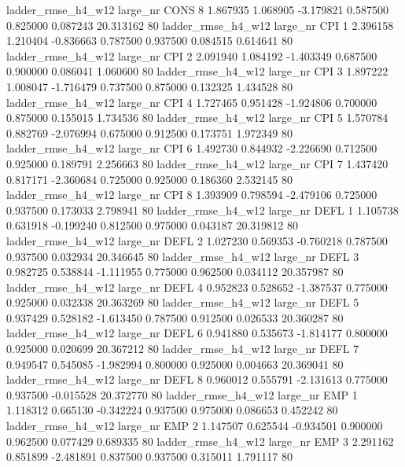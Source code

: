  ladder_rmse_h4_w12   large_nr     CONS                 8  1.867935  1.068905  -3.179821 0.587500 0.825000  0.087243   20.313162 80
 ladder_rmse_h4_w12   large_nr      CPI                 1  2.396158  1.210404  -0.836663 0.787500 0.937500  0.084515    0.614641 80
 ladder_rmse_h4_w12   large_nr      CPI                 2  2.091940  1.084192  -1.403349 0.687500 0.900000  0.086041    1.060600 80
 ladder_rmse_h4_w12   large_nr      CPI                 3  1.897222  1.008047  -1.716479 0.737500 0.875000  0.132325    1.434528 80
 ladder_rmse_h4_w12   large_nr      CPI                 4  1.727465  0.951428  -1.924806 0.700000 0.875000  0.155015    1.734536 80
 ladder_rmse_h4_w12   large_nr      CPI                 5  1.570784  0.882769  -2.076994 0.675000 0.912500  0.173751    1.972349 80
 ladder_rmse_h4_w12   large_nr      CPI                 6  1.492730  0.844932  -2.226690 0.712500 0.925000  0.189791    2.256663 80
 ladder_rmse_h4_w12   large_nr      CPI                 7  1.437420  0.817171  -2.360684 0.725000 0.925000  0.186360    2.532145 80
 ladder_rmse_h4_w12   large_nr      CPI                 8  1.393909  0.798594  -2.479106 0.725000 0.937500  0.173033    2.798941 80
 ladder_rmse_h4_w12   large_nr     DEFL                 1  1.105738  0.631918  -0.199240 0.812500 0.975000  0.043187   20.319812 80
 ladder_rmse_h4_w12   large_nr     DEFL                 2  1.027230  0.569353  -0.760218 0.787500 0.937500  0.032934   20.346645 80
 ladder_rmse_h4_w12   large_nr     DEFL                 3  0.982725  0.538844  -1.111955 0.775000 0.962500  0.034112   20.357987 80
 ladder_rmse_h4_w12   large_nr     DEFL                 4  0.952823  0.528652  -1.387537 0.775000 0.925000  0.032338   20.363269 80
 ladder_rmse_h4_w12   large_nr     DEFL                 5  0.937429  0.528182  -1.613450 0.787500 0.912500  0.026533   20.360287 80
 ladder_rmse_h4_w12   large_nr     DEFL                 6  0.941880  0.535673  -1.814177 0.800000 0.925000  0.020699   20.367212 80
 ladder_rmse_h4_w12   large_nr     DEFL                 7  0.949547  0.545085  -1.982994 0.800000 0.925000  0.004663   20.369041 80
 ladder_rmse_h4_w12   large_nr     DEFL                 8  0.960012  0.555791  -2.131613 0.775000 0.937500 -0.015528   20.372770 80
 ladder_rmse_h4_w12   large_nr      EMP                 1  1.118312  0.665130  -0.342224 0.937500 0.975000  0.086653    0.452242 80
 ladder_rmse_h4_w12   large_nr      EMP                 2  1.147507  0.625544  -0.934501 0.900000 0.962500  0.077429    0.689335 80
 ladder_rmse_h4_w12   large_nr      EMP                 3  2.291162  0.851899  -2.481891 0.837500 0.937500  0.315011    1.791117 80
